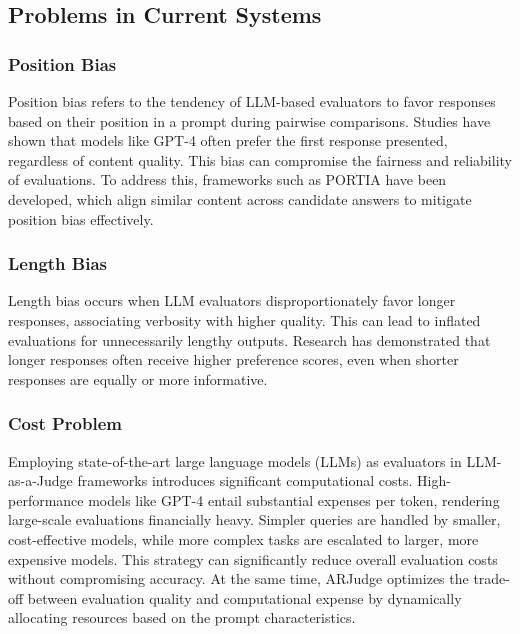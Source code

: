 \documentclass[sigconf, authoryear]{acmart}
\begin{document}
\subsection{Problems in Current Systems}\label{subsec:problems-in-current-systems}

\subsubsection{Position Bias}

Position bias refers to the tendency of LLM-based evaluators to favor responses based on their position in a prompt during pairwise comparisons.
Studies have shown that models like GPT-4 often prefer the first response presented, regardless of content quality\cite{shi2024judging}.
This bias can compromise the fairness and reliability of evaluations.
To address this, frameworks such as PORTIA have been developed, which align similar content across candidate answers to mitigate position bias effectively\cite{li-etal-2024-split}.

\subsubsection{Length Bias}

Length bias occurs when LLM evaluators disproportionately favor longer responses, associating verbosity with higher quality.
This can lead to inflated evaluations for unnecessarily lengthy outputs.
Research has demonstrated that longer responses often receive higher preference scores, even when shorter responses are equally or more informative\cite{hu2024explaining}.

\subsubsection{Cost Problem}

Employing state-of-the-art large language models (LLMs) as evaluators in LLM-as-a-Judge frameworks introduces significant computational costs.
High-performance models like GPT-4 entail substantial expenses per token, rendering large-scale evaluations financially heavy.
Simpler queries are handled by smaller, cost-effective models, while more complex tasks are escalated to larger, more expensive models.
This strategy can significantly reduce overall evaluation costs without compromising accuracy\cite{chen2023frugalgpt}.
At the same time, ARJudge optimizes the trade-off between evaluation quality and computational expense by dynamically allocating resources based on the prompt characteristics\cite{ar_judge}.
\end{document}
